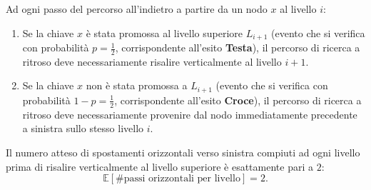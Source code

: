 Ad ogni passo del percorso all'indietro a partire da un nodo $x$ al livello $i$:
\begin{enumerate}
  \item Se la chiave $x$ è stata promossa al livello superiore $L_{i+1}$ (evento che si verifica con probabilità $p = \frac{1}{2}$, corrispondente all'esito \textbf{Testa}), il percorso di ricerca a ritroso deve necessariamente risalire verticalmente al livello $i+1$.
  \item Se la chiave $x$ non è stata promossa a $L_{i+1}$ (evento che si verifica con probabilità $1 - p = \frac{1}{2}$, corrispondente all'esito \textbf{Croce}), il percorso di ricerca a ritroso deve necessariamente provenire dal nodo immediatamente precedente a sinistra sullo stesso livello $i$.
\end{enumerate}

\begin{theorem}
Il numero atteso di spostamenti orizzontali verso sinistra compiuti ad ogni livello prima di risalire verticalmente al livello superiore è esattamente pari a $2$:
\begin{equation}
  \mathbb{E}[\# \text{passi orizzontali per livello}] = 2.
\end{equation}
\end{theorem}

